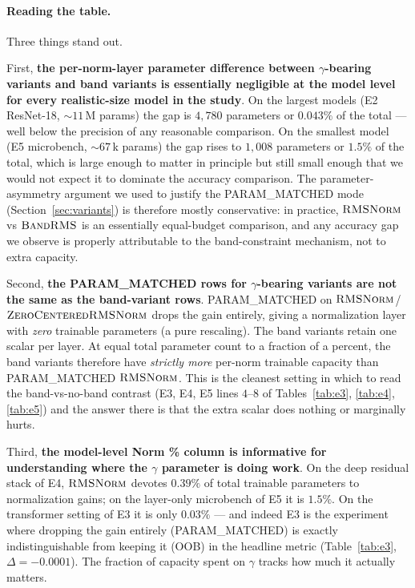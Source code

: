 \documentclass{article}
\newcommand{\rms}{\textsc{RMSNorm}}
\newcommand{\bandrms}{\textsc{BandRMS}}
\newcommand{\zcrms}{\textsc{ZeroCentered}\-\textsc{RMSNorm}}
\begin{document}
\paragraph{Reading the table.}
Three things stand out.

First, \textbf{the per-norm-layer parameter difference between $\gamma$-bearing variants and band variants is essentially negligible at the model level for every realistic-size model in the study}.
On the largest models (E2 ResNet-18, $\sim 11$\,M params) the gap is $4{,}780$ parameters or $0.043\%$ of the total --- well below the precision of any reasonable comparison.
On the smallest model (E5 microbench, $\sim 67$\,k params) the gap rises to $1{,}008$ parameters or $1.5\%$ of the total, which is large enough to matter in principle but still small enough that we would not expect it to dominate the accuracy comparison.
The parameter-asymmetry argument we used to justify the PARAM\_MATCHED mode (Section~\ref{sec:variants}) is therefore mostly conservative: in practice, $\rms{}$ vs $\bandrms{}$ is an essentially equal-budget comparison, and any accuracy gap we observe is properly attributable to the band-constraint mechanism, not to extra capacity.

Second, \textbf{the PARAM\_MATCHED rows for $\gamma$-bearing variants are not the same as the band-variant rows}.
PARAM\_MATCHED on $\rms{}$/$\zcrms{}$ drops the gain entirely, giving a normalization layer with \emph{zero} trainable parameters (a pure rescaling).
The band variants retain one scalar per layer.
At equal total parameter count to a fraction of a percent, the band variants therefore have \emph{strictly more} per-norm trainable capacity than PARAM\_MATCHED $\rms{}$.
This is the cleanest setting in which to read the band-vs-no-band contrast (E3, E4, E5 lines $4$--$8$ of Tables~\ref{tab:e3}, \ref{tab:e4}, \ref{tab:e5}) and the answer there is that the extra scalar does nothing or marginally hurts.

Third, \textbf{the model-level Norm \% column is informative for understanding where the $\gamma$ parameter is doing work}.
On the deep residual stack of E4, $\rms{}$ devotes $0.39\%$ of total trainable parameters to normalization gains; on the layer-only microbench of E5 it is $1.5\%$.
On the transformer setting of E3 it is only $0.03\%$ --- and indeed E3 is the experiment where dropping the gain entirely (PARAM\_MATCHED) is exactly indistinguishable from keeping it (OOB) in the headline metric (Table~\ref{tab:e3}, $\Delta = -0.0001$).
The fraction of capacity spent on $\gamma$ tracks how much it actually matters.
\end{document}
